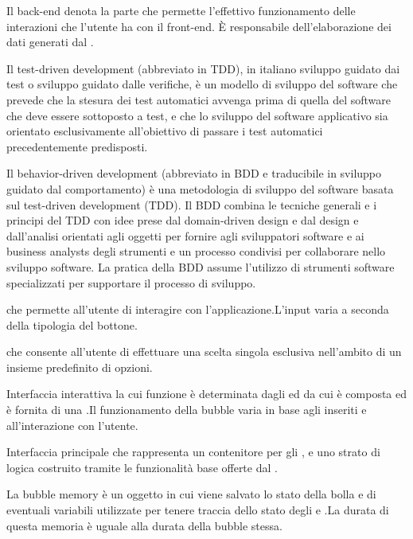 Il back-end denota la parte che permette l’effettivo funzionamento delle interazioni che l’utente ha con il front-end. \`{E} responsabile dell’elaborazione dei dati generati dal .

Il test-driven development (abbreviato in TDD), in italiano sviluppo guidato dai test o sviluppo guidato dalle verifiche, è un modello di sviluppo del software che prevede che la stesura dei test automatici avvenga prima di quella del software che deve essere sottoposto a test, e che lo sviluppo del software applicativo sia orientato esclusivamente all'obiettivo di passare i test automatici precedentemente predisposti.

Il behavior-driven development (abbreviato in BDD e traducibile in sviluppo guidato dal comportamento) è una metodologia di sviluppo del software basata sul test-driven development (TDD). Il BDD combina le tecniche generali e i principi del TDD con idee prese dal domain-driven design e dal design e dall'analisi orientati agli oggetti per fornire agli sviluppatori software e ai business analysts degli strumenti e un processo condivisi per collaborare nello sviluppo software. La pratica della BDD assume l'utilizzo di strumenti software specializzati per supportare il processo di sviluppo.

 che permette all’utente di interagire con l’applicazione.L’input varia a seconda della tipologia del bottone.  

 che consente all'utente di effettuare una scelta singola esclusiva nell'ambito di un insieme predefinito di opzioni.

Interfaccia interattiva la cui funzione è determinata dagli   ed  da cui è composta ed è fornita di una  .Il funzionamento della bubble varia in base agli  inseriti e all'interazione con l'utente.

Interfaccia principale che rappresenta un contenitore per gli ,  e uno strato di logica costruito tramite le funzionalit\`a base offerte dal .

La bubble memory è un oggetto  in cui viene salvato lo stato della bolla e di eventuali variabili utilizzate per tenere traccia dello stato degli  e .La durata di questa memoria è uguale alla durata della bubble stessa.

